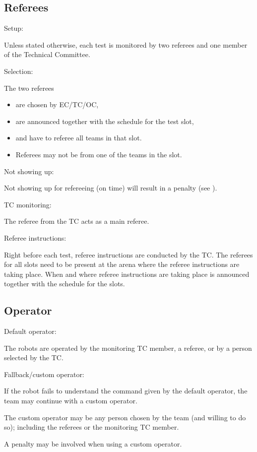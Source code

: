 \subsection{Referees}\label{rule:referees}
\begin{enumerate}
{\bf\item Setup:} Unless stated otherwise, each test is monitored by two referees and one member of the Technical Committee.
{\bf\item Selection:} The two referees 
\begin{itemize}
\item are chosen by EC/TC/OC, 
\item are announced together with the schedule for the test slot, 
\item and have to referee all teams in that slot.
\item Referees may not be from one of the teams in the slot.
\end{itemize}
{\bf\item Not showing up:} Not showing up for refereeing (on time) will result in a penalty (see ). 
{\bf\item TC monitoring:} The referee from the TC acts as a main referee. 
{\bf\item Referee instructions:} Right before each test, referee instructions are conducted by the TC. 
The referees for all slots need to be present at the arena where the referee instructions are taking place.
When and where referee instructions are taking place is announced together with the schedule for the slots.
\end{enumerate}


\subsection{Operator}\label{rule:operator}
\begin{enumerate}
{\bf\item Default operator:} The robots are operated by the monitoring TC member, 
a referee, or by a person selected by the TC.
{\bf\item Fallback/custom operator:} If the robot fails to understand the command given by the default operator, the team may continue with a custom operator.
\begin{compactitem}
\item The custom operator may be any person chosen by the team (and willing to do so); 
  including the referees or the monitoring TC member. 
\item A penalty may be involved when using a custom operator.
\end{compactitem}
\end{enumerate}


